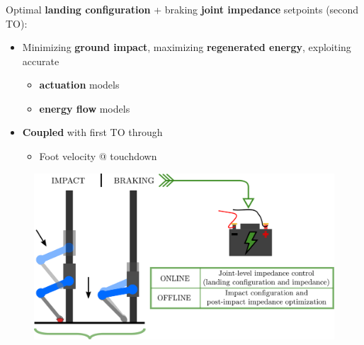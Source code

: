 \documentclass[aspectratio=169]{beamer}
\begin{document}

\begin{frame}
\frametitle{\Large}
\begin{multicols}{2}
Optimal \textbf{landing configuration} + braking \textbf{joint impedance} setpoints (second TO):
\begin{itemize}
\item Minimizing \textbf{ground impact}, maximizing \textbf{regenerated energy}, exploiting accurate\vspace{0.2cm}
\begin{itemize}
\item \textbf{actuation} models
\item \textbf{energy flow} models
\end{itemize}\vspace{0.2cm}
\item \textbf{Coupled} with first TO through\vspace{0.2cm}
\begin{itemize}
\item Foot velocity @ touchdown
\end{itemize}
\end{itemize}
\vfill\null
\columnbreak
\vfill\null
\begin{figure}
    \centering
    \includegraphics[width=1.0\columnwidth]{beamer_imgs/impact_opt_intro/second_TO.pdf}
\end{figure}
\end{multicols}
\end{frame}
\end{document}
